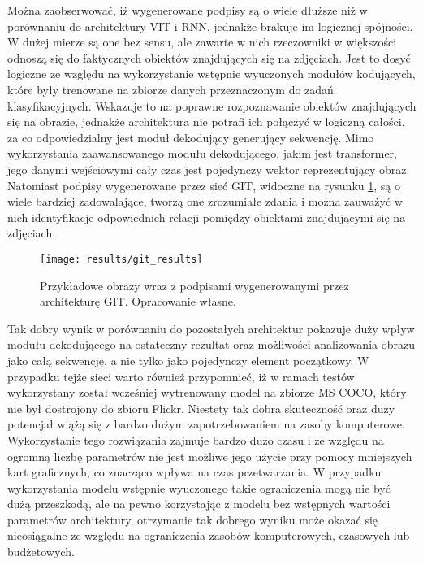 \noindent Można zaobserwować, iż wygenerowane podpisy są o wiele dłuższe niż w porównaniu do architektury VIT i RNN, jednakże brakuje im logicznej spójności. W dużej mierze są one bez sensu, ale zawarte w nich rzeczowniki w większości odnoszą się do faktycznych obiektów znajdujących się na zdjęciach. Jest to dosyć logiczne ze względu na wykorzystanie wstępnie wyuczonych modułów kodujących, które były trenowane na zbiorze danych przeznaczonym do zadań klasyfikacyjnych. Wskazuje to na poprawne rozpoznawanie obiektów znajdujących się na obrazie, jednakże architektura nie potrafi ich połączyć w logiczną całości, za co odpowiedzialny jest moduł dekodujący generujący sekwencję. Mimo wykorzystania zaawansowanego modułu dekodującego, jakim jest transformer, jego danymi wejściowymi cały czas jest pojedynczy wektor reprezentujący obraz. Natomiast podpisy wygenerowane przez sieć GIT, widoczne na rysunku \ref{fig:results-git}, są o wiele bardziej zadowalające, tworzą one zrozumiałe zdania i można zauważyć w nich identyfikacje odpowiednich relacji pomiędzy obiektami znajdującymi się na zdjęciach.
\begin{figure}[H]
    \centering
    \texttt{[image: results/git\_results]}
    \caption{Przykładowe obrazy wraz z podpisami wygenerowanymi przez architekturę GIT. Opracowanie własne.}
    \label{fig:results-git}
\end{figure}
\noindent Tak dobry wynik w porównaniu do pozostałych architektur pokazuje duży wpływ modułu dekodującego na ostateczny rezultat oraz możliwości analizowania obrazu jako całą sekwencję, a nie tylko jako pojedynczy element początkowy. W przypadku tejże sieci warto również przypomnieć, iż w ramach testów wykorzystany został wcześniej wytrenowany model na zbiorze MS COCO, który nie był dostrojony do zbioru Flickr. Niestety tak dobra skuteczność oraz duży potencjał wiążą się z bardzo dużym zapotrzebowaniem na zasoby komputerowe. Wykorzystanie tego rozwiązania zajmuje bardzo dużo czasu i ze względu na ogromną liczbę parametrów nie jest możliwe jego użycie przy pomocy mniejszych kart graficznych, co znacząco wpływa na czas przetwarzania. W przypadku wykorzystania modelu wstępnie wyuczonego takie ograniczenia mogą nie być dużą przeszkodą, ale na pewno korzystając z modelu bez wstępnych wartości parametrów architektury, otrzymanie tak dobrego wyniku może okazać się nieosiągalne ze względu na ograniczenia zasobów komputerowych, czasowych lub budżetowych.

